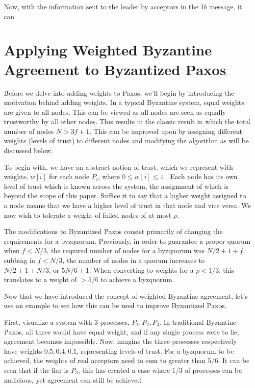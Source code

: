 \documentclass[conference]{IEEEtran}
\begin{document}
Now, with the information sent to the leader by acceptors in the 1$b$ message, it can 

\section{Applying Weighted Byzantine Agreement to Byzantized Paxos}
Before we delve into adding weights to Paxos, we'll begin by introducing the motivation behind adding weights. In a typical Byzantine system, equal weights are given to all nodes. This can be viewed as all nodes are seen as equally trustworthy by all other nodes. This results in the classic result in which the total number of nodes $N > 3f + 1$. This can be improved upon by assigning different weights (levels of trust) to different nodes and modifying the algorithm as will be discussed below.

To begin with, we have an abstract notion of trust, which we represent with weights, $w[i]$ for each node $P_i$, where $0 \leq w[i] \leq 1$ . Each node has its own level of trust which is known across the system, the assignment of which is beyond the scope of this paper. Suffice it to say that a higher weight assigned to a node means that we have a higher level of trust in that node and vice versa. We now wish to tolerate a weight of failed nodes of at most $\rho$.

The modifications to Byzantized Paxos consist primarily of changing the requirements for a byzquorum. Previously, in order to guarantee a proper quorum when $f < N/3$, the required number of nodes for a byzquorum was $N/2 + 1 + f$, subbing in $f < N/3$, the number of nodes in a quorum increases to $N/2 + 1 + N/3$, or $5N/6 + 1$. When converting to weights for a $\rho < 1/3$, this translates to a weight of $> 5/6$ to achieve a byzquorum.

Now that we have introduced the concept of weighted Byzantine agreement, let's use an example to see how this can be used to improve Byzantized Paxos.

First, visualize a system with 3 processes, ${P_1, P_2, P_3}$. In traditional Byzantine Paxos, all three would have equal weight, and if any single process were to lie, agreement becomes impossible. Now, imagine the three processes respectively have weights ${0.5, 0.4, 0.1}$, representing levels of trust. For a byzquorum to be achieved, the weights of real acceptors need to sum to greater than $5/6$. It can be seen that if the liar is $P_3$, this has created a case where 1/3 of processes can be malicious, yet agreement can still be achieved. 
\end{document}
